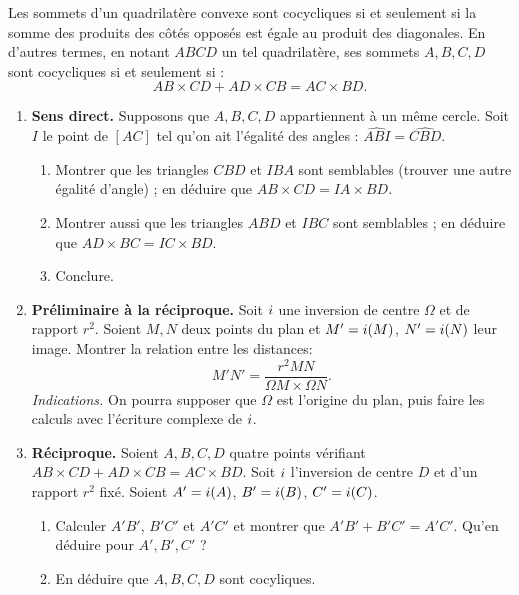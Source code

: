 \documentclass[11pt,class=report,crop=false]{standalone}
\begin{document}
\begin{exercicecours}
\label{exo:inversion_ptoleme}


\og{}Les sommets d'un quadrilatère convexe sont cocycliques si et seulement si la somme des produits des côtés opposés est égale au produit des diagonales.\fg{}
En d'autres termes, en notant $ABCD$ un tel quadrilatère, ses sommets $A,B,C,D$ sont cocycliques si et seulement si : 
$$AB \times CD + AD\times CB = AC \times BD.$$



\begin{enumerate}
 \item \textbf{Sens direct.}
 Supposons que $A, B, C, D$ appartiennent à un même cercle.
 Soit $I$ le point de $[AC]$ tel qu'on ait l'égalité des angles : $\widehat{ABI} = \widehat{CBD}$.
   \begin{enumerate}
     \item Montrer que les triangles $CBD$ et $IBA$ sont semblables (trouver une autre égalité d'angle) ; 
     en déduire que 
     $AB \times CD = IA \times BD$.
     \item Montrer aussi que les triangles $ABD$ et $IBC$ sont semblables ; en déduire que $AD \times BC = IC \times BD$.
     \item Conclure.
   \end{enumerate}  
   
   
 \item \textbf{Préliminaire à la réciproque.}
 Soit $i$  une inversion de centre $\Omega$ et de rapport $r^2$. Soient $M, N$ deux points du plan et
   $M'=i(M)$, $N'=i(N)$ leur image. Montrer la relation entre les distances:
   $$M'N' = \frac{r^2 MN}{\Omega M \times \Omega N}.$$
   \emph{Indications.} On pourra supposer que $\Omega$ est l'origine du plan, puis faire
   les calculs avec l'écriture complexe de $i$.
   
 \item \textbf{Réciproque.}  
 Soient $A,B,C,D$ quatre points vérifiant $AB \times CD + AD\times CB = AC \times BD.$
  Soit $i$ l'inversion de centre $D$ et d'un rapport $r^2$ fixé. Soient $A'=i(A)$, $B'=i(B)$, 
  $C'=i(C)$.
  \begin{enumerate}
   \item Calculer $A'B'$, $B'C'$ et $A'C'$ et montrer que $A'B'+B'C'=A'C'$. Qu'en déduire pour $A', B', C'$ ?
   \item En déduire que $A,B,C,D$ sont cocyliques.
 \end{enumerate}  
\end{enumerate}
\end{exercicecours}
\end{document}
